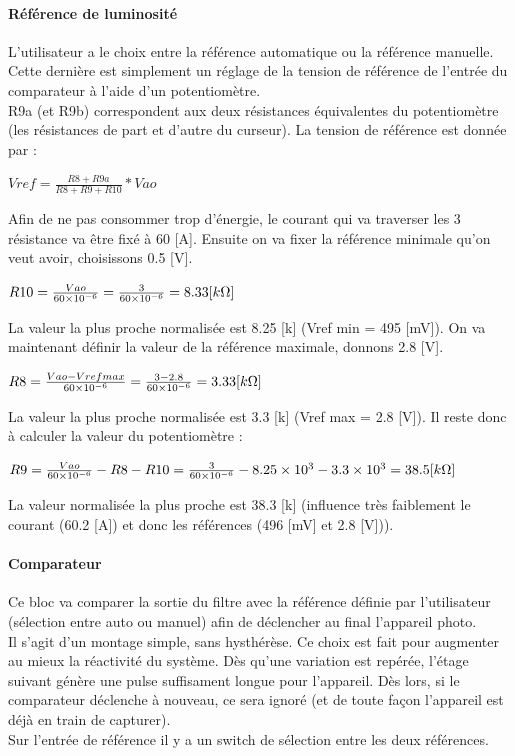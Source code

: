 \documentclass[a4paper,10pt]{article}
\begin{document}
\paragraph{Référence de luminosité}
L'utilisateur a le choix entre la référence automatique ou la référence manuelle. Cette dernière est simplement un réglage de la tension de référence de l'entrée du comparateur à l'aide d'un potentiomètre.\\
R9a (et R9b) correspondent aux deux résistances équivalentes du potentiomètre (les résistances de part et d'autre du curseur). La tension de référence est donnée par :
\begin{center}
 $ Vref = \frac{R8+R9a}{R8+R9+R10}*Vao $
\end{center}
Afin de ne pas consommer trop d'énergie, le courant qui va traverser les 3 résistance va être fixé à 60 [\micro A]. Ensuite on va fixer la référence minimale qu'on veut avoir, choisissons 0.5 [V].
\begin{center}
 $ R10 = \frac{Vao}{\num{60e-6}} = \frac{3}{\num{60e-6}} = 8.33 [k\ohm] $
\end{center}
La valeur la plus proche normalisée est 8.25 [k\ohm] (Vref min = 495 [mV]). On va maintenant définir la valeur de la référence maximale, donnons 2.8 [V].
\begin{center}
 $ R8 = \frac{Vao-Vref max}{\num{60e-6}} = \frac{3-2.8}{\num{60e-6}} = 3.33 [k\ohm] $
\end{center}
La valeur la plus proche normalisée est 3.3 [k\ohm] (Vref max = 2.8 [V]). Il reste donc à calculer la valeur du potentiomètre :
\begin{center}
 $ R9 = \frac{Vao}{\num{60e-6}}-R8-R10 = \frac{3}{\num{60e-6}}-\num{8.25e3}-\num{3.3e3} = 38.5 [k\ohm] $
\end{center}
La valeur normalisée la plus proche est 38.3 [k\ohm] (influence très faiblement le courant (60.2 [\micro A]) et donc les références (496 [mV] et 2.8 [V])).

\paragraph{Comparateur}
Ce bloc va comparer la sortie du filtre avec la référence définie par l'utilisateur (sélection entre auto ou manuel) afin de déclencher au final l'appareil photo. \\
Il s'agit d'un montage simple, sans hysthérèse. Ce choix est fait pour augmenter au mieux la réactivité du système. Dès qu'une variation est repérée, l'étage suivant génère une pulse suffisament longue pour l'appareil. Dès lors, si le comparateur déclenche à nouveau, ce sera ignoré (et de toute façon l'appareil est déjà en train de capturer). \\
Sur l'entrée de référence il y a un switch de sélection entre les deux références.
\end{document}
